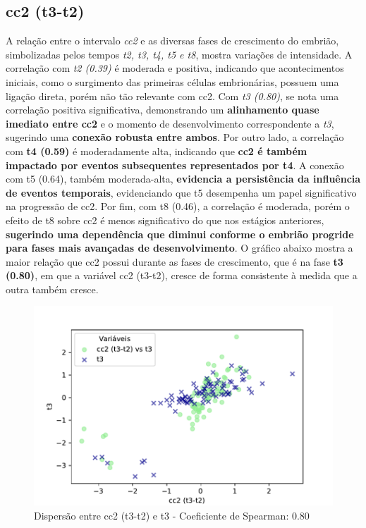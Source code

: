 \subsection*{cc2 (t3-t2)}
A relação entre o intervalo \textit{cc2} e as diversas fases de crescimento do embrião, simbolizadas pelos tempos \textit{t2, t3, t4, t5 e t8}, mostra variações de intensidade. A correlação com \textit{t2 (0.39)} é moderada e positiva, indicando que acontecimentos iniciais, como o surgimento das primeiras células embrionárias, possuem uma ligação direta, porém não tão relevante com cc2. Com \textit{t3 (0.80)}, se nota uma correlação positiva significativa, demonstrando um \textbf{alinhamento quase imediato entre cc2} e o momento de desenvolvimento correspondente a \textit{t3}, sugerindo uma \textbf{conexão robusta entre ambos}. Por outro lado, a correlação com \textbf{t4 (0.59)} é moderadamente alta, indicando que \textbf{cc2 é também impactado por eventos subsequentes representados por t4}. A conexão com t5 (0.64), também moderada-alta, \textbf{evidencia a persistência da influência de eventos temporais}, evidenciando que t5 desempenha um papel significativo na progressão de cc2. Por fim, com t8 (0.46), a correlação é moderada, porém o efeito de t8 sobre cc2 é menos significativo do que nos estágios anteriores, \textbf{sugerindo uma dependência que diminui conforme o embrião progride para fases mais avançadas de desenvolvimento}. O gráfico abaixo mostra a maior relação que cc2 possui durante as fases de crescimento, que é na fase \textbf{t3 (0.80)}, em que a variável cc2 (t3-t2), cresce de forma consistente à medida que a outra também cresce. 

\begin{figure}[h]
    \captionsetup{font=footnotesize, justification=centering, labelsep=period, position=above}
    \caption{Dispersão entre cc2 (t3-t2) e t3 - Coeficiente de Spearman: 0.80}
    \label{fig:cc2-t3}
    \centering
    \includegraphics[scale=0.4]{figuras/Spearman/cc2-t3.pdf}
    \vspace{0.3cm} 
    \begin{minipage}{\linewidth}
        \centering
    \end{minipage}
\end{figure}
\FloatBarrier

